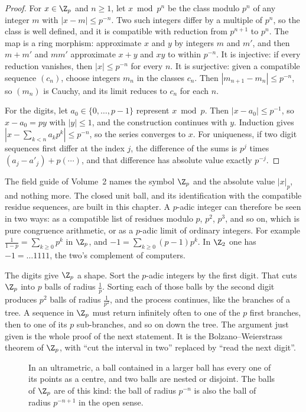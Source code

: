 \begin{proof}
For $x\in\Z_p$ and $n\ge1$, let $x\bmod p^n$ be the class modulo $p^n$ of any integer $m$ with $|x-m|\le p^{-n}$. Two such integers differ by a multiple of $p^n$, so the class is well defined, and it is compatible with reduction from $p^{n+1}$ to $p^n$. The map is a ring morphism: approximate $x$ and $y$ by integers $m$ and $m'$, and then $m+m'$ and $mm'$ approximate $x+y$ and $xy$ to within $p^{-n}$. It is injective: if every reduction vanishes, then $|x|\le p^{-n}$ for every $n$. It is surjective: given a compatible sequence $(c_n)$, choose integers $m_n$ in the classes $c_n$. Then $|m_{n+1}-m_n|\le p^{-n}$, so $(m_n)$ is Cauchy, and its limit reduces to $c_n$ for each $n$.

For the digits, let $a_0\in\{0,\dots,p-1\}$ represent $x\bmod p$. Then $|x-a_0|\le p^{-1}$, so $x-a_0=py$ with $|y|\le1$, and the construction continues with $y$. Induction gives $|x-\sum_{k<n}a_kp^k|\le p^{-n}$, so the series converges to $x$. For uniqueness, if two digit sequences first differ at the index $j$, the difference of the sums is $p^j$ times $(a_j-a'_j)+p(\cdots)$, and that difference has absolute value exactly $p^{-j}$.
\end{proof}

The field guide of Volume~2 names the symbol $\Z_p$ and the absolute value $|x|_p$, and nothing more. The closed unit ball, and its identification with the compatible residue sequences, are built in this chapter. A $p$-adic integer can therefore be seen in two ways: as a compatible list of residues modulo $p$, $p^2$, $p^3$, and so on, which is pure congruence arithmetic, or as a $p$-adic limit of ordinary integers. For example $\frac1{1-p}=\sum_{k\ge0}p^k$ in $\Z_p$, and $-1=\sum_{k\ge0}(p-1)p^k$. In $\Z_2$ one has $-1=\ldots1111$, the two's complement of computers.

The digits give $\Z_p$ a shape. Sort the $p$-adic integers by the first digit. That cuts $\Z_p$ into $p$ balls of radius $\frac1p$. Sorting each of those balls by the second digit produces $p^2$ balls of radius $\frac1{p^2}$, and the process continues, like the branches of a tree. A sequence in $\Z_p$ must return infinitely often to one of the $p$ first branches, then to one of its $p$ sub-branches, and so on down the tree. The argument just given is the whole proof of the next statement. It is the Bolzano--Weierstrass theorem of $\Z_p$, with ``cut the interval in two'' replaced by ``read the next digit''.

\begin{figure}[ht]
\centering
{}
\caption{In an ultrametric, a ball contained in a larger ball has every one of its points as a centre, and two balls are nested or disjoint. The balls of $\Z_p$ are of this kind: the ball of radius $p^{-n}$ is also the ball of radius $p^{-n+1}$ in the open sense.}
\label{fig:rwultra}
\end{figure}

